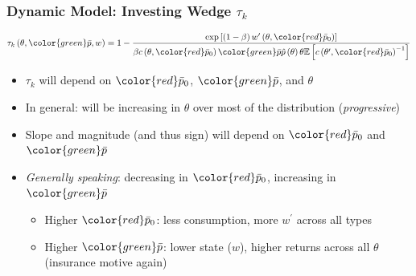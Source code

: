 \documentclass{beamer}
\begin{document}
\begin{frame}
    \frametitle{Dynamic Model: Investing Wedge \( \tau_k \)}
    \begin{equation*}
        \tau_{k}\left(\theta,{\color{green}\bar{p}},w\right)=1-\frac{\exp\left[\left(1-\beta\right)w^{\prime}\left(\theta,{\color{red}\bar{p}_{0}}\right)\right]}{\beta c\left(\theta,{\color{red}\bar{p}_{0}}\right){\color{green}\bar{p}}\hat{p}\left(\theta\right)\theta\mathbb{E}\left[c\left(\theta^{\prime},{\color{red}\bar{p}_{0}}\right)^{-1}\right]}
    \end{equation*}
    \begin{itemize}
        \item \( \tau_k \) will depend on \( {\color{red}\bar{p}_{0}} \), \( {\color{green}\bar{p}} \), and \( \theta \)
        \item In general: will be increasing in \( \theta \) over most of the distribution (\textit{progressive})
        \item Slope and magnitude (and thus sign) will depend on \( {\color{red}\bar{p}_{0}} \) and \( {\color{green}\bar{p}} \)
        \item \textit{Generally speaking}: decreasing in  \( {\color{red}\bar{p}_{0}} \), increasing in \( {\color{green}\bar{p}} \) 
        \begin{itemize}
            \item Higher \( {\color{red}\bar{p}_{0}} \): less consumption, more \( w^\prime \) across all types 
            \item Higher \( {\color{green}\bar{p}} \): lower state (\( w \)), higher returns across all \( \theta \) (insurance motive again)
        \end{itemize}
    \end{itemize}

\end{frame}
\end{document}
